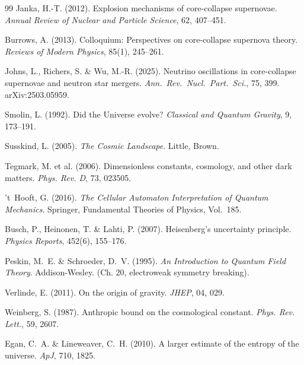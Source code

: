 \documentclass[12pt,a4paper]{article}
\theoremstyle{remark}
\begin{document}
\begin{thebibliography}{99}
Janka, H.-T. (2012).
\newblock Explosion mechanisms of core-collapse supernovae.
\newblock \textit{Annual Review of Nuclear and Particle Science}, 62, 407--451.

Burrows, A. (2013).
\newblock Colloquium: Perspectives on core-collapse supernova theory.
\newblock \textit{Reviews of Modern Physics}, 85(1), 245--261.

Johns, L., Richers, S. \& Wu, M.-R. (2025).
\newblock Neutrino oscillations in core-collapse supernovae and neutron star mergers.
\newblock \textit{Ann.\ Rev.\ Nucl.\ Part.\ Sci.}, 75, 399. arXiv:2503.05959.

Smolin, L. (1992).
\newblock Did the Universe evolve?
\newblock \textit{Classical and Quantum Gravity}, 9, 173--191.

Susskind, L. (2005).
\newblock \textit{The Cosmic Landscape}.
\newblock Little, Brown.

Tegmark, M. et al. (2006).
\newblock Dimensionless constants, cosmology, and other dark matters.
\newblock \textit{Phys. Rev. D}, 73, 023505.

't~Hooft, G. (2016).
\newblock \textit{The Cellular Automaton Interpretation of Quantum Mechanics}.
\newblock Springer, Fundamental Theories of Physics, Vol.~185.

Busch, P., Heinonen, T. \& Lahti, P. (2007).
\newblock Heisenberg's uncertainty principle.
\newblock \textit{Physics Reports}, 452(6), 155--176.

Peskin, M.~E. \& Schroeder, D.~V. (1995).
\newblock \textit{An Introduction to Quantum Field Theory}.
\newblock Addison-Wesley. (Ch. 20, electroweak symmetry breaking).

Verlinde, E. (2011).
\newblock On the origin of gravity.
\newblock \textit{JHEP}, 04, 029.

Weinberg, S. (1987).
\newblock Anthropic bound on the cosmological constant.
\newblock \textit{Phys. Rev. Lett.}, 59, 2607.

Egan, C.~A. \& Lineweaver, C.~H. (2010).
\newblock A larger estimate of the entropy of the universe.
\newblock \textit{ApJ}, 710, 1825.


\end{thebibliography}
\end{document}
